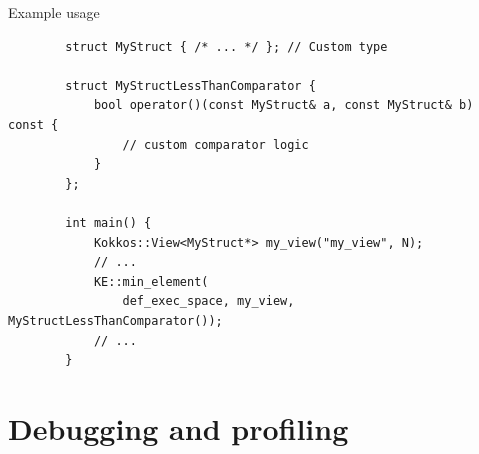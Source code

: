 \documentclass[
    aspectratio=169,
    \createHandout
]{beamer}
\begin{document}
\begin{frame}[fragile]{Example usage}
    \begin{verbatim}
        struct MyStruct { /* ... */ }; // Custom type

        struct MyStructLessThanComparator {
            bool operator()(const MyStruct& a, const MyStruct& b) const {
                // custom comparator logic
            }
        };

        int main() {
            Kokkos::View<MyStruct*> my_view("my_view", N);
            // ...
            KE::min_element(
                def_exec_space, my_view, MyStructLessThanComparator());
            // ...
        }
    \end{verbatim}
\end{frame}



\section{Debugging and profiling}
\end{document}

